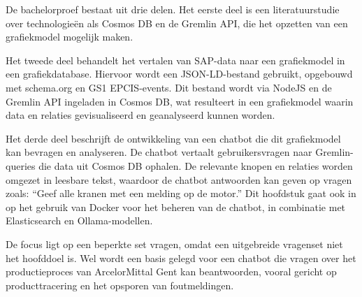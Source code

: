 De bachelorproef bestaat uit drie delen. 
Het eerste deel is een literatuurstudie over technologieën als Cosmos DB en de Gremlin API, die het opzetten van een grafiekmodel mogelijk maken. 

Het tweede deel behandelt het vertalen van SAP-data naar een grafiekmodel in een grafiekdatabase. 
Hiervoor wordt een JSON-LD-bestand gebruikt, opgebouwd met schema.org en GS1 EPCIS-events. 
Dit bestand wordt via NodeJS en de Gremlin API ingeladen in Cosmos DB, wat resulteert in een grafiekmodel waarin data en relaties gevisualiseerd en geanalyseerd kunnen worden.

Het derde deel beschrijft de ontwikkeling van een chatbot die dit grafiekmodel kan bevragen en analyseren. 
De chatbot vertaalt gebruikersvragen naar Gremlin-queries die data uit Cosmos DB ophalen. 
De relevante knopen en relaties worden omgezet in leesbare tekst, waardoor de chatbot antwoorden kan geven op vragen zoals: ``Geef alle kranen met een melding op de motor.''
Dit hoofdstuk gaat ook in op het gebruik van Docker voor het beheren van de chatbot, in combinatie met Elasticsearch en Ollama-modellen.

De focus ligt op een beperkte set vragen, omdat een uitgebreide vragenset niet het hoofddoel is. 
Wel wordt een basis gelegd voor een chatbot die vragen over het productieproces van ArcelorMittal Gent kan beantwoorden, vooral gericht op producttracering en het opsporen van foutmeldingen.